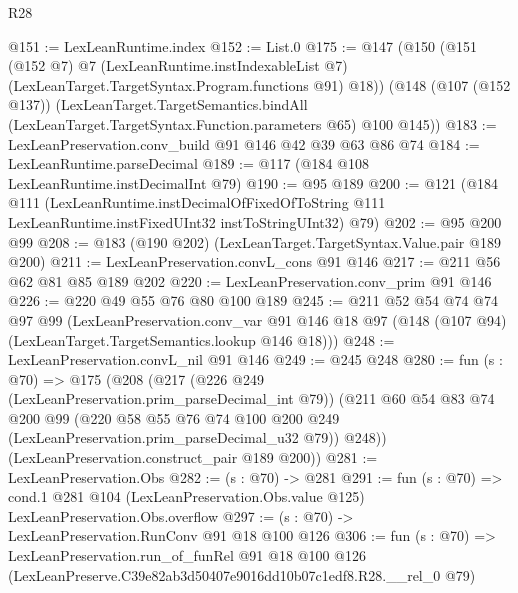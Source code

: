\begin{lexlean}{R28}
\begin{coremodule}
@151 := LexLeanRuntime.index
@152 := List.{0}
@175 := @147
    (@150
      (@151
        (@152 @7)
        @7
        (LexLeanRuntime.instIndexableList @7)
        (LexLeanTarget.TargetSyntax.Program.functions @91)
        @18))
    (@148
      (@107 (@152 @137))
      (LexLeanTarget.TargetSemantics.bindAll
        (LexLeanTarget.TargetSyntax.Function.parameters @65)
        @100
        @145))
@183 := LexLeanPreservation.conv_build @91 @146 @42 @39 @63 @86 @74
@184 := LexLeanRuntime.parseDecimal
@189 := @117 (@184 @108 LexLeanRuntime.instDecimalInt @79)
@190 := @95 @189
@200 := @121
    (@184
      @111
      (LexLeanRuntime.instDecimalOfFixedOfToString
        @111
        LexLeanRuntime.instFixedUInt32
        instToStringUInt32)
      @79)
@202 := @95 @200 @99
@208 := @183 (@190 @202) (LexLeanTarget.TargetSyntax.Value.pair @189 @200)
@211 := LexLeanPreservation.convL_cons @91 @146
@217 := @211 @56 @62 @81 @85 @189 @202
@220 := LexLeanPreservation.conv_prim @91 @146
@226 := @220 @49 @55 @76 @80 @100 @189
@245 := @211
    @52
    @54
    @74
    @74
    @97
    @99
    (LexLeanPreservation.conv_var
      @91
      @146
      @18
      @97
      (@148 (@107 @94) (LexLeanTarget.TargetSemantics.lookup @146 @18)))
@248 := LexLeanPreservation.convL_nil @91 @146
@249 := @245 @248
@280 := fun (s : @70) =>
  @175
    (@208
      (@217
        (@226 @249 (LexLeanPreservation.prim_parseDecimal_int @79))
        (@211
          @60
          @54
          @83
          @74
          @200
          @99
          (@220 @58 @55 @76 @74 @100 @200 @249 (LexLeanPreservation.prim_parseDecimal_u32 @79))
          @248))
      (LexLeanPreservation.construct_pair @189 @200))
@281 := LexLeanPreservation.Obs
@282 := (s : @70) -> @281
@291 := fun (s : @70) =>
  cond.{1} @281 @104 (LexLeanPreservation.Obs.value @125) LexLeanPreservation.Obs.overflow
@297 := (s : @70) -> LexLeanPreservation.RunConv @91 @18 @100 @126
@306 := fun (s : @70) =>
  LexLeanPreservation.run_of_funRel
    @91
    @18
    @100
    @126
    (LexLeanPreserve.C39e82ab3d50407e9016dd10b07c1edf8.R28.__rel_0 @79)
\end{coremodule}
\end{lexlean}
